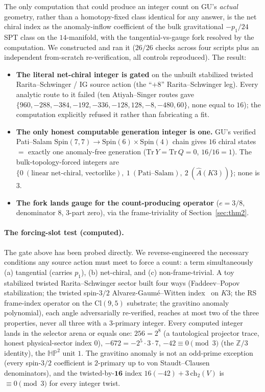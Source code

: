 \documentclass[11pt]{article}
\theoremstyle{definition}
\theoremstyle{remark}
\newcommand{\Z}{\mathbb{Z}}
\newcommand{\Cl}{\mathrm{Cl}}
\newcommand{\Spin}{\mathrm{Spin}}
\newcommand{\Ahat}{\hat{A}}
\newcommand{\ch}{\mathrm{ch}}
\begin{document}
The only computation that could produce an integer count on GU's \emph{actual} geometry, rather than a
homotopy-fixed class identical for any answer, is the net chiral index as the anomaly-inflow coefficient of the
bulk gravitational $-p_1/24$ SPT class on the $14$-manifold, with the tangential-vs-gauge fork resolved by the
computation. We constructed and ran it ($26/26$ checks across four scripts plus an independent from-scratch
re-verification, all controls reproduced). The result:
\begin{itemize}[leftmargin=1.6em]
\item \textbf{The literal net-chiral integer is gated} on the unbuilt stabilized twisted Rarita--Schwinger / IG
source action (the ``$+8$'' Rarita--Schwinger leg). Every analytic route to it failed (ten Atiyah--Singer routes
gave $\{960,-288,-384,-192,-336,-128,128,-8,-480,60\}$, none equal to $16$); the computation explicitly refused
it rather than fabricating a fit.
\item \textbf{The only honest computable generation integer is one.} GU's verified Pati--Salam
$\Spin(7,7)\to\Spin(6)\times\Spin(4)$ chain gives $16$ chiral states $=$ exactly one anomaly-free generation
($\mathrm{Tr}\,Y = \mathrm{Tr}\,Q = 0$, $16/16 = 1$). The bulk-topology-forced integers are
$\{0~(\text{linear net-chiral, vectorlike}),\ 1~(\text{Pati--Salam}),\ 2~(\Ahat(K3))\}$; none is $3$.
\item \textbf{The fork lands gauge for the count-producing operator} ($e=3/8$, denominator $8$, $3$-part zero),
via the frame-triviality of Section~\ref{sec:thm2}.
\end{itemize}

\paragraph{The forcing-slot test (computed).} The gate above has been probed directly. We reverse-engineered the
necessary conditions any source action must meet to force a count: a term simultaneously (a) tangential (carries
$p_1$), (b) net-chiral, and (c) non-frame-trivial. A toy stabilized twisted Rarita--Schwinger sector built four
ways (Faddeev--Popov stabilization; the twisted spin-$3/2$ Alvarez-Gaum\'e--Witten index~\cite{alvarezgaume1984grav} on $K3$; the
RS frame-index operator on the $\Cl(9,5)$ substrate; the gravitino anomaly polynomial), each angle adversarially
re-verified, reaches at most two of the three properties, never all three with a $3$-primary integer. Every
computed integer lands in the selector arena or equals one: $256 = 2^8$ (a tautological projector trace, honest
physical-sector index $0$), $-672 = -2^5\cdot 3\cdot 7$, $-42 \equiv 0 \pmod 3$ (the $\Z/3$ identity), the
$\mathbb{HP}^2$ unit $1$. The gravitino anomaly is not an odd-prime exception (every spin-$3/2$ coefficient is
$2$-primary up to von Staudt--Clausen~\cite{vonstaudtclausen1840} denominators), and the
twisted-by-$\mathbf{16}$ index $16(-42)+3\,\ch_2(V)$
is $\equiv 0 \pmod 3$ for every integer twist.
\end{document}
